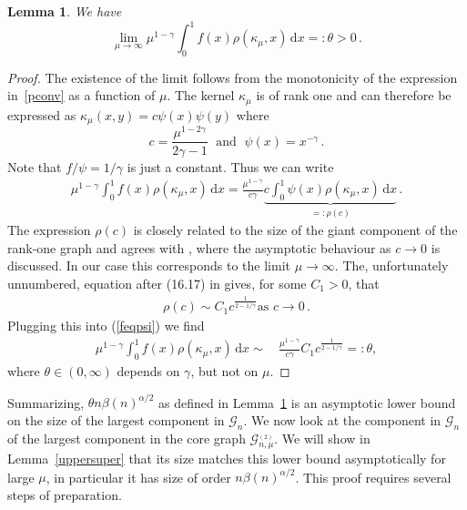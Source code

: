 \documentclass[12pt,a4paper]{article}
\numberwithin{equation}{section}
\newtheorem{lemma}[shared]{Lemma}
\begin{document}
\begin{lemma}\label{mu}
    We have
    $$ \lim_{\mu\to\infty} \mu^{1-\gamma} \int_0^1 f(x) \rho(\kappa_\mu , x)\,\text{d}x =: \theta >0\,.$$
\end{lemma}

\begin{proof}
   The existence of the limit follows from the monotonicity of the expression in~\eqref{pconv} as a function of $\mu$. The kernel $\kappa_\mu$ is of rank one and can therefore be expressed as 
   $\kappa_\mu(x,y) = c \psi(x)\psi(y)$
   where 
   $$c= \frac{\mu^{1-2\gamma}}{2\gamma-1}\;\text{ and }\;\psi(x)=x^{-\gamma}\,.$$
   Note that $f/\psi=1/\gamma$ is just a constant. Thus we can write 
   \begin{align} \label{feqpsi}   
   \mu^{1-\gamma} \int_0^1 f(x) \rho(\kappa_\mu , x)\,\text{d}x =\frac{\mu^{1-\gamma}}{c\gamma} \underbrace{c\int_0^1 \psi(x) \rho(\kappa_\mu , x)\,\text{d}x}_{=:\rho(c)}\,. \end{align}
   The expression $\rho(c)$ is closely related to the size of the giant component of the rank-one graph and agrees with \cite[Equation (16.12)]{rjb}, where the asymptotic behaviour as $c\to 0$ is discussed. In our case this corresponds to the limit $\mu\to\infty$. The, unfortunately unnumbered, equation after (16.17) in \cite{rjb} gives, for some $C_1>0$, that
   \begin{align}\label{rhoc}
       \rho(c) \sim C_1 c^{\tfrac{1}{2-1/\gamma}} \text{as } c\to 0\,.
   \end{align}
   Plugging this into (\ref{feqpsi}) we find 
   \begin{align*}
        \mu^{1-\gamma} \int_0^1 f(x) \rho(\kappa_\mu , x)\,\text{d}x\sim\,&\frac{\mu^{1-\gamma}}{c\gamma}C_1 c^{\tfrac{1}{2-1/\gamma}}
         =: \theta ,
   \end{align*}
   where $\theta\in(0,\infty)$ depends on $\gamma$, but not on $\mu$.
\end{proof}

Summarizing, $\theta n \beta(n)^{\alpha/2}$ as defined in Lemma~\ref{mu} is an asymptotic lower bound on the size of the largest component in $\mathscr G_n$. 
We now look at the component in $\mathscr G_n$ of the largest component in the core graph $\mathcal G_{n,\mu}^{_{(2)}}$. We will show in Lemma~\ref{uppersuper} that its size matches this lower bound asymptotically for large $\mu$, in particular it has size of order $n \beta(n)^{\alpha/2}$. This proof requires several steps of preparation.%
\smallskip
\end{document}
